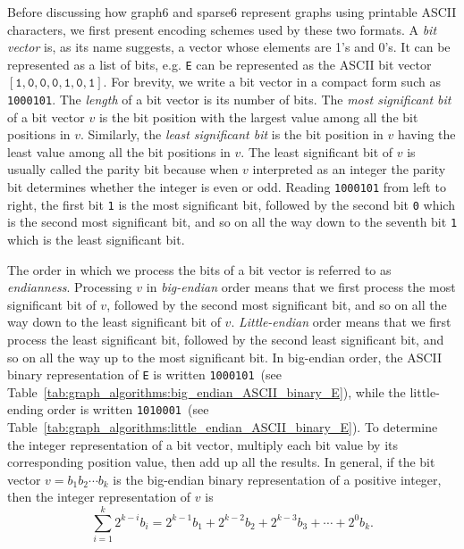 Before discussing how graph6 and sparse6 represent graphs using
printable ASCII characters, we first present encoding schemes used by
these two formats. A \emph{bit vector} is, as its name suggests, a
vector whose elements are 1's and 0's. It can be represented as a list
of bits, e.g. \verb!E! can be represented as the ASCII bit vector
$[\texttt{1}, \texttt{0}, \texttt{0}, \texttt{0}, \texttt{1},
  \texttt{0}, \texttt{1}]$. For brevity, we write a bit vector in a
compact form such as \texttt{1000101}. The \emph{length} of a bit
vector is its number of bits. The \emph{most significant bit}
of a bit vector $v$ is the bit position with the largest value among
all the bit positions in $v$. Similarly, the
\emph{least significant bit} is the bit position in $v$ having the
least value among all the bit positions in $v$. The least significant
bit of $v$ is usually called the parity bit because when $v$
interpreted as an integer the parity bit determines whether the
integer is even or odd. Reading \texttt{1000101} from left to right,
the first bit \texttt{1} is the most significant bit, followed by the
second bit \texttt{0} which is the second most significant bit, and so
on all the way down to the seventh bit \texttt{1} which is the least
significant bit.

The order in which we process the bits of a bit vector is referred to
as \emph{endianness}. Processing $v$ in \emph{big-endian} order means
that we first process the most significant bit of $v$, followed by the
second most significant bit, and so on all the way down to the least
significant bit of $v$. \emph{Little-endian} order means that we first
process the least significant bit, followed by the second least
significant bit, and so on all the way up to the most significant
bit. In big-endian order, the ASCII binary representation of
\texttt{E} is written \texttt{1000101}~(see
Table~\ref{tab:graph_algorithms:big_endian_ASCII_binary_E}), while
the little-ending order is written \texttt{1010001}~(see
Table~\ref{tab:graph_algorithms:little_endian_ASCII_binary_E}). To
determine the integer representation of a bit vector, multiply each
bit value by its corresponding position value, then add up all the
results. In general, if the bit vector $v = b_1 b_2 \cdots b_k$ is the
big-endian binary representation of a positive integer, then the
integer representation of $v$ is
%
\begin{equation}
\label{eq:graph_algorithms:big_endian_binary_to_integer}
\sum_{i=1}^k 2^{k-i} b_i
=
2^{k-1} b_1 + 2^{k-2} b_2 + 2^{k-3} b_3 + \cdots + 2^0 b_k.
\end{equation}

